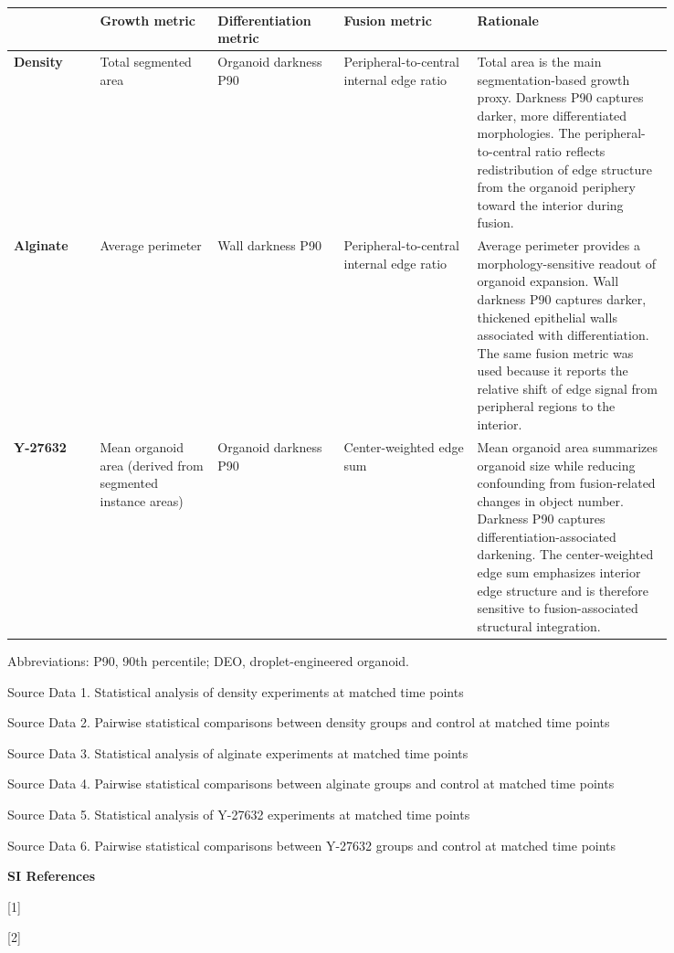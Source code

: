 \documentclass[
]{article}
\begin{document}
\begin{longtable}[]{@{}>{\raggedright\arraybackslash}p{0.11\linewidth}>{\raggedright\arraybackslash}p{0.15\linewidth}>{\raggedright\arraybackslash}p{0.16\linewidth}>{\raggedright\arraybackslash}p{0.17\linewidth}>{\raggedright\arraybackslash}p{0.25\linewidth}@{}}
\toprule
& \textbf{Growth metric} & \textbf{Differentiation metric} & \textbf{Fusion metric} & \textbf{Rationale} \\
\midrule
\endhead
\textbf{Density} & Total segmented area & Organoid darkness P90 & Peripheral-to-central internal edge ratio & Total area is the main segmentation-based growth proxy. Darkness P90 captures darker, more differentiated morphologies. The peripheral-to-central ratio reflects redistribution of edge structure from the organoid periphery toward the interior during fusion. \\
\textbf{Alginate} & Average perimeter & Wall darkness P90 & Peripheral-to-central internal edge ratio & Average perimeter provides a morphology-sensitive readout of organoid expansion. Wall darkness P90 captures darker, thickened epithelial walls associated with differentiation. The same fusion metric was used because it reports the relative shift of edge signal from peripheral regions to the interior. \\
\textbf{Y-27632} & Mean organoid area (derived from segmented instance areas) & Organoid darkness P90 & Center-weighted edge sum & Mean organoid area summarizes organoid size while reducing confounding from fusion-related changes in object number. Darkness P90 captures differentiation-associated darkening. The center-weighted edge sum emphasizes interior edge structure and is therefore sensitive to fusion-associated structural integration. \\
\bottomrule
\end{longtable}

Abbreviations: P90, 90th percentile; DEO, droplet-engineered organoid.

Source Data 1. Statistical analysis of density experiments at matched time points

Source Data 2. Pairwise statistical comparisons between density groups and control at matched time points

Source Data 3. Statistical analysis of alginate experiments at matched time points

Source Data 4. Pairwise statistical comparisons between alginate groups and control at matched time points

Source Data 5. Statistical analysis of Y-27632 experiments at matched time points

Source Data 6. Pairwise statistical comparisons between Y-27632 groups and control at matched time points

\textbf{SI References}

{[}1{]}

{[}2{]}
\end{document}
